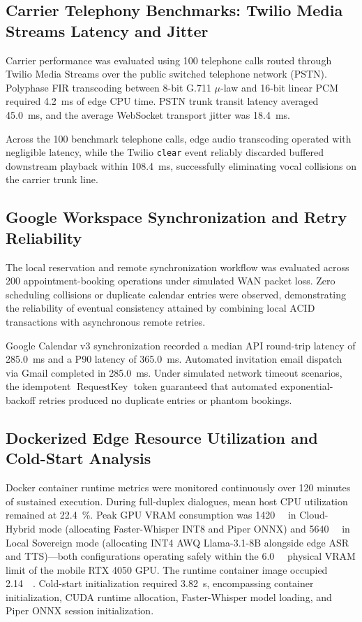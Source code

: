 \documentclass[review,12pt,times,authoryear]{elsarticle}
\theoremstyle{definition}
\begin{document}
\subsection{Carrier Telephony Benchmarks: Twilio Media Streams Latency and Jitter}
Carrier performance was evaluated using 100 telephone calls routed through Twilio Media Streams over the public switched telephone network (PSTN). Polyphase FIR transcoding between 8-bit G.711 $\mu$-law and 16-bit linear PCM required \SI{4.2}{\milli\second} of edge CPU time. PSTN trunk transit latency averaged \SI{45.0}{\milli\second}, and the average WebSocket transport jitter was \SI{18.4}{\milli\second}. 

Across the 100 benchmark telephone calls, edge audio transcoding operated with negligible latency, while the Twilio \texttt{clear} event reliably discarded buffered downstream playback within \SI{108.4}{\milli\second}, successfully eliminating vocal collisions on the carrier trunk line.

\subsection{Google Workspace Synchronization and Retry Reliability}
\label{sec:gws_eval}
The local reservation and remote synchronization workflow was evaluated across 200 appointment-booking operations under simulated WAN packet loss. Zero scheduling collisions or duplicate calendar entries were observed, demonstrating the reliability of eventual consistency attained by combining local ACID transactions with asynchronous remote retries.

Google Calendar v3 synchronization recorded a median API round-trip latency of \SI{285.0}{\milli\second} and a P90 latency of \SI{365.0}{\milli\second}. Automated invitation email dispatch via Gmail completed in \SI{285.0}{\milli\second}. Under simulated network timeout scenarios, the idempotent $\operatorname{RequestKey}$ token guaranteed that automated exponential-backoff retries produced no duplicate entries or phantom bookings.

\subsection{Dockerized Edge Resource Utilization and Cold-Start Analysis}
Docker container runtime metrics were monitored continuously over 120 minutes of sustained execution. During full-duplex dialogues, mean host CPU utilization remained at \SI{22.4}{\percent}. Peak GPU VRAM consumption was \SI{1420}{\mega\byte} in Cloud-Hybrid mode (allocating Faster-Whisper INT8 and Piper ONNX) and \SI{5640}{\mega\byte} in Local Sovereign mode (allocating INT4 AWQ Llama-3.1-8B alongside edge ASR and TTS)—both configurations operating safely within the \SI{6.0}{\giga\byte} physical VRAM limit of the mobile RTX 4050 GPU. The runtime container image occupied \SI{2.14}{\giga\byte}. Cold-start initialization required \SI{3.82}{\second}, encompassing container initialization, CUDA runtime allocation, Faster-Whisper model loading, and Piper ONNX session initialization.
\end{document}

